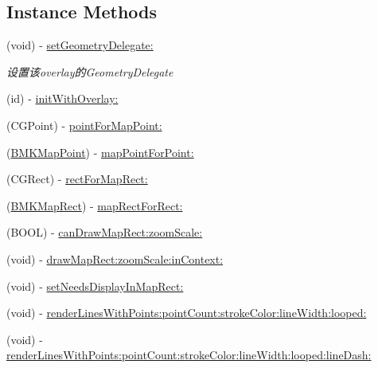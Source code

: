 \subsection*{Instance Methods}
\begin{DoxyCompactItemize}
\item 
\hypertarget{interface_b_m_k_overlay_view_a2a9f42799b36989d9f1faac29892026a}{(void) -\/ \hyperlink{interface_b_m_k_overlay_view_a2a9f42799b36989d9f1faac29892026a}{set\+Geometry\+Delegate\+:}}\label{interface_b_m_k_overlay_view_a2a9f42799b36989d9f1faac29892026a}

\begin{DoxyCompactList}\small\item\em 设置该overlay的\+Geometry\+Delegate \end{DoxyCompactList}\item 
(id) -\/ \hyperlink{interface_b_m_k_overlay_view_a93cdba852e915d6a417b95edabe4af4c}{init\+With\+Overlay\+:}
\item 
(C\+G\+Point) -\/ \hyperlink{interface_b_m_k_overlay_view_a211d0d55b1c10b0abca45e83f4fcf05c}{point\+For\+Map\+Point\+:}
\item 
(\hyperlink{struct_b_m_k_map_point}{B\+M\+K\+Map\+Point}) -\/ \hyperlink{interface_b_m_k_overlay_view_ab0270107a383cf49fd46d9b624604d53}{map\+Point\+For\+Point\+:}
\item 
(C\+G\+Rect) -\/ \hyperlink{interface_b_m_k_overlay_view_a4eb52fd9951bcfc898e9a026ee40e99e}{rect\+For\+Map\+Rect\+:}
\item 
(\hyperlink{struct_b_m_k_map_rect}{B\+M\+K\+Map\+Rect}) -\/ \hyperlink{interface_b_m_k_overlay_view_ae8c0f0415357f281451eaa602b3f388b}{map\+Rect\+For\+Rect\+:}
\item 
(B\+O\+O\+L) -\/ \hyperlink{interface_b_m_k_overlay_view_ad5c0685243ded79bc6657ebb7df08f87}{can\+Draw\+Map\+Rect\+:zoom\+Scale\+:}
\item 
(void) -\/ \hyperlink{interface_b_m_k_overlay_view_aad771b4c325461d99b142e79287188dc}{draw\+Map\+Rect\+:zoom\+Scale\+:in\+Context\+:}
\item 
(void) -\/ \hyperlink{interface_b_m_k_overlay_view_aca005b8bf49d57b404da473fd6f0d534}{set\+Needs\+Display\+In\+Map\+Rect\+:}
\item 
(void) -\/ \hyperlink{interface_b_m_k_overlay_view_a67fcc048446dfa1725aa4a86b241b282}{render\+Lines\+With\+Points\+:point\+Count\+:stroke\+Color\+:line\+Width\+:looped\+:}
\item 
(void) -\/ \hyperlink{interface_b_m_k_overlay_view_a81a56677ce4da3b33a07430793784341}{render\+Lines\+With\+Points\+:point\+Count\+:stroke\+Color\+:line\+Width\+:looped\+:line\+Dash\+:}

\end{DoxyCompactItemize}
